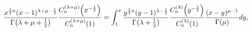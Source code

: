 \[\frac{x^{\frac{1}{2}n}(x-1)^{\lambda+\mu-\frac{1}{2}}}{\mathop{\Gamma\/}%
\nolimits\!\left(\lambda+\mu+\tfrac{1}{2}\right)}\frac{\mathop{C^{(\lambda+\mu%
)}_{n}\/}\nolimits\!\left(x^{-\frac{1}{2}}\right)}{\mathop{C^{(\lambda+\mu)}_{%
n}\/}\nolimits\!\left(1\right)}=\int_{1}^{x}\frac{y^{\frac{1}{2}n}(y-1)^{%
\lambda-\frac{1}{2}}}{\mathop{\Gamma\/}\nolimits\!\left(\lambda+\tfrac{1}{2}%
\right)}\frac{\mathop{C^{(\lambda)}_{n}\/}\nolimits\!\left(y^{-\frac{1}{2}}%
\right)}{\mathop{C^{(\lambda)}_{n}\/}\nolimits\!\left(1\right)}\frac{(x-y)^{%
\mu-1}}{\mathop{\Gamma\/}\nolimits\!\left(\mu\right)}dy,\]